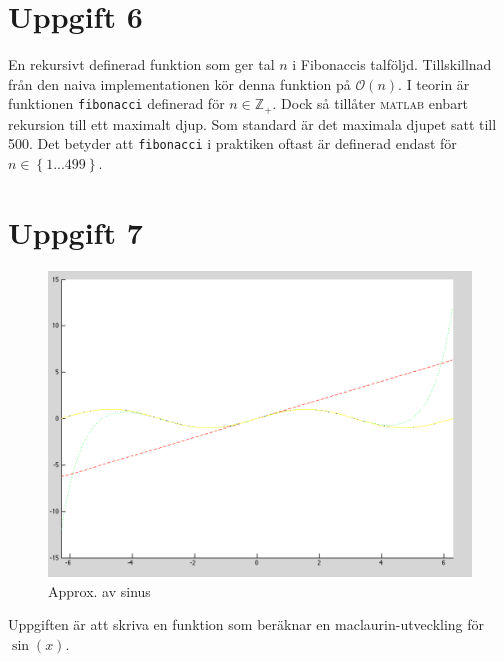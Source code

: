 \documentclass[a4paper,11pt]{article}
\begin{document}
    \section*{Uppgift 6}
    En rekursivt definerad funktion som ger tal $n$ i Fibonaccis talföljd.
    Tillskillnad från den naiva implementationen kör denna funktion på
    $\mathcal{O}(n)$.
    I teorin är funktionen \verb+fibonacci+ definerad för $n \in \mathbb{Z}_+ $.
    Dock så tillåter \textsc{matlab} enbart rekursion till ett maximalt djup.
    Som standard är det maximala djupet satt till 500.
    Det betyder att \verb+fibonacci+ i praktiken oftast är definerad endast för
    $n \in \left\{ 1...499 \right\}$.
    \begin{samepage}
    \end{samepage}

    \section*{Uppgift 7}
    \begin{figure}
        \includegraphics[width=\textwidth]{ex7.png}
        \caption{Approx. av sinus}
    \end{figure}
    Uppgiften är att skriva en funktion som beräknar en maclaurin-utveckling för
    $\sin (x)$.

    \begin{samepage}
    \end{samepage}
\end{document}
